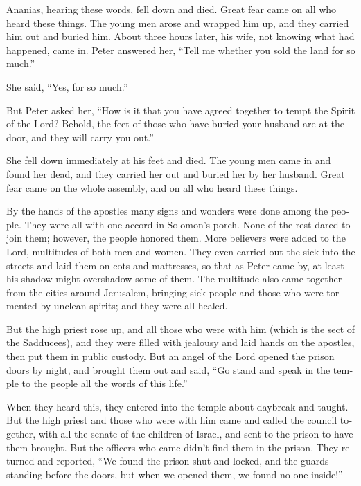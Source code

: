 \begin{paracol}{2}
\begin{otherlanguage}{english}
 Ananias, hearing these words, fell down and died. Great
fear came on all who heard these things.  The young men
arose and wrapped him up, and they carried him out and buried him.
 About three hours later, his wife, not knowing what had
happened, came in.  Peter answered her, ``Tell me whether
you sold the land for so much.''

She said, ``Yes, for so much.''

 But Peter asked her, ``How is it that you have agreed
together to tempt the Spirit of the Lord? Behold, the feet of those who
have buried your husband are at the door, and they will carry you out.''

 She fell down immediately at his feet and died. The
young men came in and found her dead, and they carried her out and
buried her by her husband.  Great fear came on the whole
assembly, and on all who heard these things.

 By the hands of the apostles many signs and wonders were
done among the people. They were all with one accord in Solomon's porch.
 None of the rest dared to join them; however, the people
honored them.  More believers were added to the Lord,
multitudes of both men and women.  They even carried out
the sick into the streets and laid them on cots and mattresses, so that
as Peter came by, at least his shadow might overshadow some of them.
 The multitude also came together from the cities around
Jerusalem, bringing sick people and those who were tormented by unclean
spirits; and they were all healed.

 But the high priest rose up, and all those who were with
him (which is the sect of the Sadducees), and they were filled with
jealousy  and laid hands on the apostles, then put them
in public custody.  But an angel of the Lord opened the
prison doors by night, and brought them out and said, 
``Go stand and speak in the temple to the people all the words of this
life.''

 When they heard this, they entered into the temple about
daybreak and taught. But the high priest and those who were with him
came and called the council together, with all the senate of the
children of Israel, and sent to the prison to have them brought.
 But the officers who came didn't find them in the
prison. They returned and reported,  ``We found the
prison shut and locked, and the guards standing before the doors, but
when we opened them, we found no one inside!''


\end{otherlanguage}
\end{paracol}
